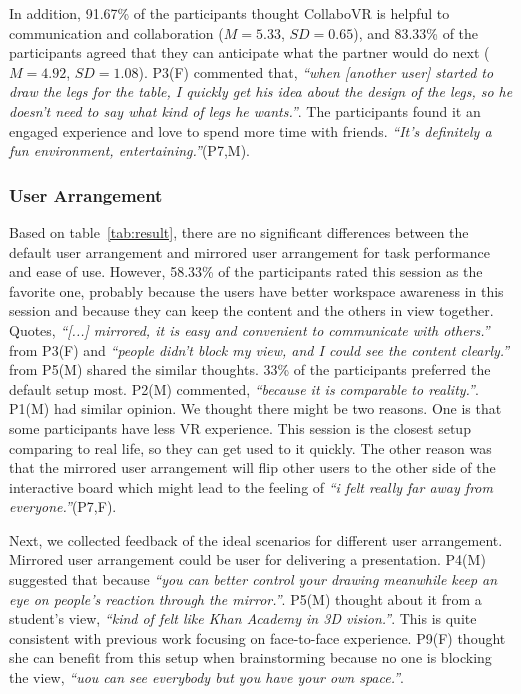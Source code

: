 \documentclass{sigchi}
\begin{document}
In addition, 91.67\% of the participants thought CollaboVR is helpful to communication and collaboration ($M=5.33$, $SD=0.65$), and 83.33\% of the participants agreed that they can anticipate what the partner would do next ($M=4.92$, $SD=1.08$). P3(F) commented that, \textit{``when [another user] started to draw the legs for the table, I quickly get his idea about the design of the legs, so he doesn't need to say what kind of legs he wants.''}. The participants found it an engaged experience and love to spend more time with friends. \textit{``It's definitely a fun environment, entertaining.''}(P7,M).

\subsubsection{User Arrangement}
Based on table~\ref{tab:result}, there are no significant differences between the default user arrangement and mirrored user arrangement for task performance and ease of use. However, 58.33\% of the participants rated this session as the favorite one, probably because the users have better workspace awareness in this session and because they can keep the content and the others in view together. Quotes, \textit{``[...] mirrored, it is easy and convenient to communicate with others.''} from P3(F) and \textit{``people didn't block my view, and I could see the content clearly.''} from P5(M) shared the similar thoughts. 33\% of the participants preferred the default setup most. P2(M) commented, \textit{``because it is comparable to reality.''}. P1(M) had similar opinion. We thought there might be two reasons. One is that some participants have less VR experience. This session is the closest setup comparing to real life, so they can get used to it quickly. The other reason was that the mirrored user arrangement will flip other users to the other side of the interactive board which might lead to the feeling of \textit{``i felt really far away from everyone.''}(P7,F).

Next, we collected feedback of the ideal scenarios for different user arrangement. Mirrored user arrangement could be user for delivering a presentation. P4(M) suggested that because \textit{``you can better control your drawing meanwhile keep an eye on people's reaction through the mirror.''}. P5(M) thought about it from a student's view, \textit{``kind of felt like Khan Academy in 3D vision.''}. This is quite consistent with previous work focusing on face-to-face experience. P9(F) thought she can benefit from this setup when brainstorming because no one is blocking the view, \textit{``uou can see everybody but you have your own space.''}.
\end{document}
